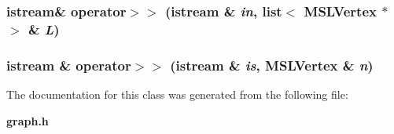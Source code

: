 \subsubsection{\setlength{\rightskip}{0pt plus 5cm}istream\& operator$>$$>$ (istream \& {\em in}, list$<$ MSLVertex $\ast$$>$ \& {\em L})\hspace{0.3cm}{\tt  [friend]}}\label{class_MSLVertex_l4}


\subsubsection{\setlength{\rightskip}{0pt plus 5cm}istream \& operator$>$$>$ (istream \& {\em is}, MSLVertex \& {\em n})\hspace{0.3cm}{\tt  [friend]}}\label{class_MSLVertex_l2}




The documentation for this class was generated from the following file:\begin{CompactItemize}
\item 
{\bf graph.h}\end{CompactItemize}
